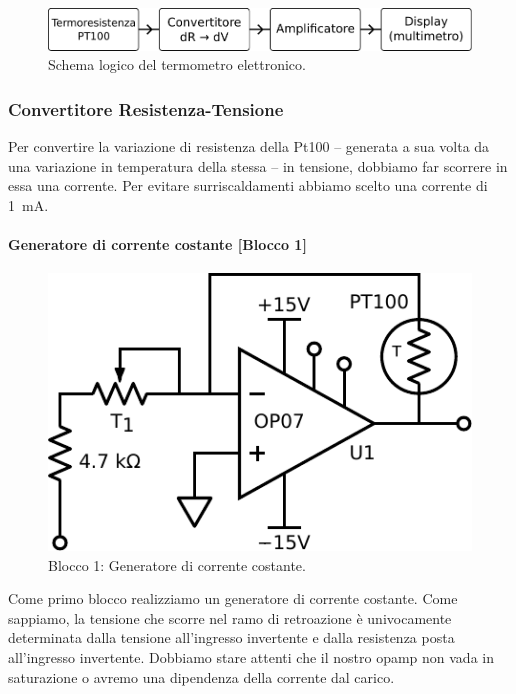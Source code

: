 \begin{figure}[htpc]
	\begin{minipage}{0.7\textwidth}
		\centering
		\includegraphics[width=.86\textwidth]{../E06/latex/s1.pdf}
		\caption{Schema logico del termometro elettronico.}
		\label{fig6:scheme1}
	\end{minipage}
\end{figure}

\subsubsection{Convertitore Resistenza-Tensione}
Per convertire la variazione di resistenza della Pt100 -- generata a sua volta da una variazione in temperatura della stessa -- in tensione, dobbiamo far scorrere in essa una corrente.
Per evitare surriscaldamenti abbiamo scelto una corrente di \SI{1}{\milli\ampere}.
%
\paragraph{Generatore di corrente costante [Blocco 1]\newline}

\begin{figure}
\centering
\includegraphics[width=.3\textwidth]{../E06/latex/P1.pdf}
\caption{Blocco 1: Generatore di corrente costante.}
\label{cir6:blocco1}
\end{figure}

Come primo blocco realizziamo un generatore di corrente costante.
Come sappiamo, la tensione che scorre nel ramo di retroazione è univocamente determinata dalla tensione all'ingresso invertente e dalla resistenza posta all'ingresso invertente.
Dobbiamo stare attenti che il nostro opamp non vada in saturazione o avremo una dipendenza della corrente dal carico.

